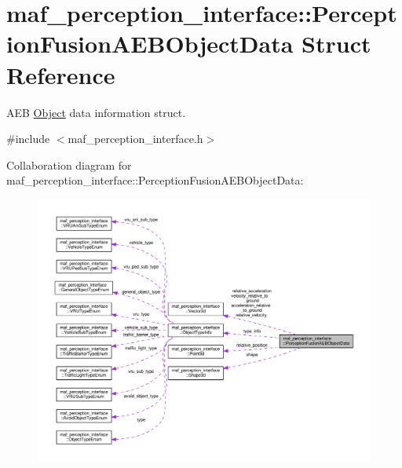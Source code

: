 \hypertarget{structmaf__perception__interface_1_1PerceptionFusionAEBObjectData}{}\section{maf\+\_\+perception\+\_\+interface\+:\+:Perception\+Fusion\+A\+E\+B\+Object\+Data Struct Reference}
\label{structmaf__perception__interface_1_1PerceptionFusionAEBObjectData}


A\+EB \hyperlink{structmaf__perception__interface_1_1Object}{Object} data information struct.  




{\ttfamily \#include $<$maf\+\_\+perception\+\_\+interface.\+h$>$}



Collaboration diagram for maf\+\_\+perception\+\_\+interface\+:\+:Perception\+Fusion\+A\+E\+B\+Object\+Data\+:\nopagebreak
\begin{figure}[H]
\begin{center}
\leavevmode
\includegraphics[width=350pt]{structmaf__perception__interface_1_1PerceptionFusionAEBObjectData__coll__graph}
\end{center}
\end{figure}
